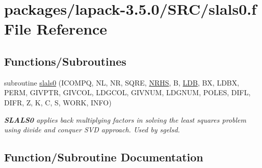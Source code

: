 \hypertarget{slals0_8f}{}\section{packages/lapack-\/3.5.0/\+S\+R\+C/slals0.f File Reference}
\label{slals0_8f}
\subsection*{Functions/\+Subroutines}
\begin{DoxyCompactItemize}
\item 
subroutine \hyperlink{slals0_8f_a5ef6e7c1cdb213f54b4d782b39dd0ee3}{slals0} (I\+C\+O\+M\+P\+Q, N\+L, N\+R, S\+Q\+R\+E, \hyperlink{example__user_8c_aa0138da002ce2a90360df2f521eb3198}{N\+R\+H\+S}, B, \hyperlink{example__user_8c_a50e90a7104df172b5a89a06c47fcca04}{L\+D\+B}, B\+X, L\+D\+B\+X, P\+E\+R\+M, G\+I\+V\+P\+T\+R, G\+I\+V\+C\+O\+L, L\+D\+G\+C\+O\+L, G\+I\+V\+N\+U\+M, L\+D\+G\+N\+U\+M, P\+O\+L\+E\+S, D\+I\+F\+L, D\+I\+F\+R, Z, K, C, S, W\+O\+R\+K, I\+N\+F\+O)
\begin{DoxyCompactList}\small\item\em {\bfseries S\+L\+A\+L\+S0} applies back multiplying factors in solving the least squares problem using divide and conquer S\+V\+D approach. Used by sgelsd. \end{DoxyCompactList}\end{DoxyCompactItemize}


\subsection{Function/\+Subroutine Documentation}
\hypertarget{slals0_8f_a5ef6e7c1cdb213f54b4d782b39dd0ee3}{}
